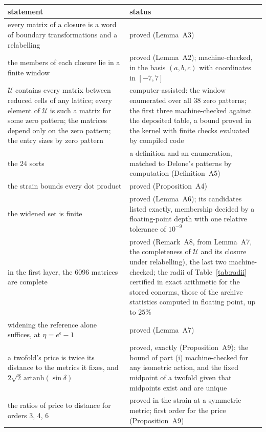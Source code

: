 \begin{widetable}
\caption{What is proved, what rests on an exhaustive computation, and what is checked or refuted.}
\label{tab:proved}
\begin{footnotesize}
\begin{tabular}{>{\raggedright\arraybackslash}p{9.6cm}>{\raggedright\arraybackslash}p{8.0cm}}
\toprule
statement & status \\
\midrule
every matrix of a closure is a word of boundary transformations and a relabelling & proved (Lemma~A3) \\
the members of each closure lie in a finite window & proved (Lemma~A2); machine-checked, in the basis $(a,b,c)$ with coordinates in $[-7,7]$ \\
$\mathcal U$ contains every matrix between reduced cells of any lattice; every element of $\mathcal U$ is such a matrix for some zero pattern; the matrices depend only on the zero pattern; the entry sizes by zero pattern & computer-assisted: the window enumerated over all 38 zero patterns; the first three machine-checked against the deposited table, a bound proved in the kernel with finite checks evaluated by compiled code \\
the 24 sorts & a definition and an enumeration, matched to Delone's patterns by computation (Definition~A5) \\
the strain bounds every dot product & proved (Proposition~A4) \\
the widened set is finite & proved (Lemma~A6); its candidates listed exactly, membership decided by a floating-point depth with one relative tolerance of $10^{-9}$ \\
in the first layer, the 6096 matrices are complete & proved (Remark~A8, from Lemma~A7, the completeness of $\mathcal U$ and its closure under relabelling), the last two machine-checked; the radii of Table~\ref{tab:radii} certified in exact arithmetic for the stored conorms, those of the archive statistics computed in floating point, up to $25\%$ \\
widening the reference alone suffices, at $\eta=e^\epsilon-1$ & proved (Lemma~A7) \\
a twofold's price is twice its distance to the metrics it fixes, and $2\sqrt2\,\mathrm{artanh}(\sin\delta)$ & proved, exactly (Proposition~A9); the bound of part (i) machine-checked for any isometric action, and the fixed midpoint of a twofold given that midpoints exist and are unique \\
the ratios of price to distance for orders 3, 4, 6 & proved in the strain at a symmetric metric; first order for the price (Proposition~A9) \\

\end{tabular}
\end{footnotesize}
\end{widetable}

